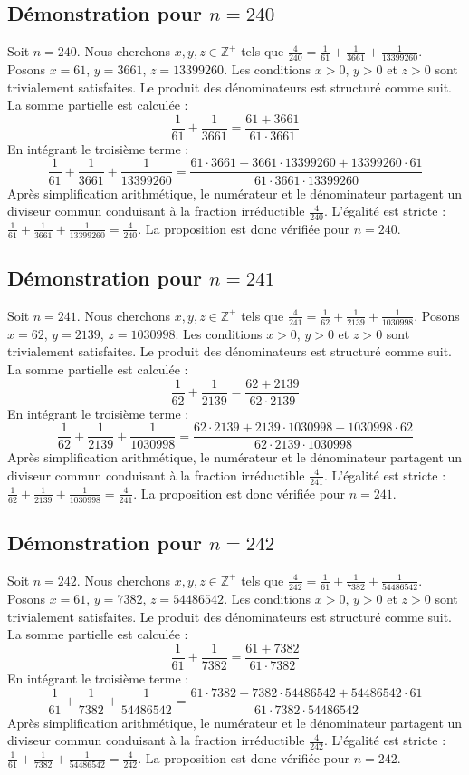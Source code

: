 \documentclass[11pt,a4paper]{article}
\begin{document}
\subsection{Démonstration pour $n = 240$}
Soit $n = 240$. Nous cherchons $x, y, z \in \mathbb{Z}^{+}$ tels que $\frac{4}{240} = \frac{1}{61} + \frac{1}{3661} + \frac{1}{13399260}$.
Posons $x = 61$, $y = 3661$, $z = 13399260$.
Les conditions $x > 0$, $y > 0$ et $z > 0$ sont trivialement satisfaites.
Le produit des dénominateurs est structuré comme suit. La somme partielle est calculée :
$$ \frac{1}{61} + \frac{1}{3661} = \frac{61+3661}{61 \cdot 3661} $$
En intégrant le troisième terme :
$$ \frac{1}{61} + \frac{1}{3661} + \frac{1}{13399260} = \frac{61 \cdot 3661 + 3661 \cdot 13399260 + 13399260 \cdot 61}{61 \cdot 3661 \cdot 13399260} $$
Après simplification arithmétique, le numérateur et le dénominateur partagent un diviseur commun conduisant à la fraction irréductible $\frac{4}{240}$.
L'égalité est stricte : $\frac{1}{61} + \frac{1}{3661} + \frac{1}{13399260} = \frac{4}{240}$.
La proposition est donc vérifiée pour $n = 240$.
\subsection{Démonstration pour $n = 241$}
Soit $n = 241$. Nous cherchons $x, y, z \in \mathbb{Z}^{+}$ tels que $\frac{4}{241} = \frac{1}{62} + \frac{1}{2139} + \frac{1}{1030998}$.
Posons $x = 62$, $y = 2139$, $z = 1030998$.
Les conditions $x > 0$, $y > 0$ et $z > 0$ sont trivialement satisfaites.
Le produit des dénominateurs est structuré comme suit. La somme partielle est calculée :
$$ \frac{1}{62} + \frac{1}{2139} = \frac{62+2139}{62 \cdot 2139} $$
En intégrant le troisième terme :
$$ \frac{1}{62} + \frac{1}{2139} + \frac{1}{1030998} = \frac{62 \cdot 2139 + 2139 \cdot 1030998 + 1030998 \cdot 62}{62 \cdot 2139 \cdot 1030998} $$
Après simplification arithmétique, le numérateur et le dénominateur partagent un diviseur commun conduisant à la fraction irréductible $\frac{4}{241}$.
L'égalité est stricte : $\frac{1}{62} + \frac{1}{2139} + \frac{1}{1030998} = \frac{4}{241}$.
La proposition est donc vérifiée pour $n = 241$.
\subsection{Démonstration pour $n = 242$}
Soit $n = 242$. Nous cherchons $x, y, z \in \mathbb{Z}^{+}$ tels que $\frac{4}{242} = \frac{1}{61} + \frac{1}{7382} + \frac{1}{54486542}$.
Posons $x = 61$, $y = 7382$, $z = 54486542$.
Les conditions $x > 0$, $y > 0$ et $z > 0$ sont trivialement satisfaites.
Le produit des dénominateurs est structuré comme suit. La somme partielle est calculée :
$$ \frac{1}{61} + \frac{1}{7382} = \frac{61+7382}{61 \cdot 7382} $$
En intégrant le troisième terme :
$$ \frac{1}{61} + \frac{1}{7382} + \frac{1}{54486542} = \frac{61 \cdot 7382 + 7382 \cdot 54486542 + 54486542 \cdot 61}{61 \cdot 7382 \cdot 54486542} $$
Après simplification arithmétique, le numérateur et le dénominateur partagent un diviseur commun conduisant à la fraction irréductible $\frac{4}{242}$.
L'égalité est stricte : $\frac{1}{61} + \frac{1}{7382} + \frac{1}{54486542} = \frac{4}{242}$.
La proposition est donc vérifiée pour $n = 242$.
\end{document}
